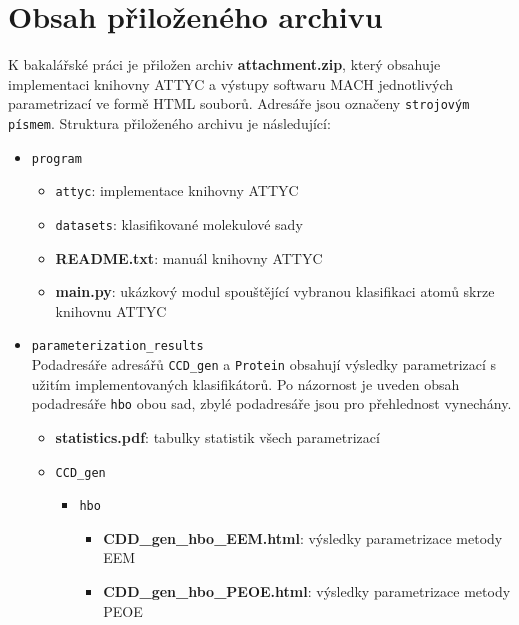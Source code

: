 
\makeatletter
{}
\makeatother
\chapter{Obsah přiloženého archivu}
\label{prilozeny_archiv}
K bakalářské práci je přiložen archiv \textbf{attachment.zip}, který obsahuje implementaci kni\-hovny ATTYC a výstupy softwaru MACH jednotlivých parametrizací ve formě HTML souborů. Adresáře  jsou označeny \verb|strojovým písmem|. Struktura přiloženého archivu je následující: 
\begin{itemize}
    \item \verb|program| 
    \begin{itemize}
        \item \verb|attyc|: implementace knihovny ATTYC
        \item \verb|datasets|: klasifikované molekulové sady 
        \item \textbf{README.txt}: manuál knihovny ATTYC
        \item\textbf{main.py}: ukázkový modul spouštějící vybranou klasifikaci atomů skrze knihovnu ATTYC
    \end{itemize}
    \item \verb|parameterization_results| \\
    Podadresáře adresářů \verb|CCD_gen| a \verb|Protein| obsahují výsledky parametrizací s uži\-tím implementovaných  klasifikátorů. Po názornost je uveden obsah podadresáře \verb|hbo| obou sad, zbylé podadresáře jsou pro přehlednost vynechány.
    \begin{itemize}
        \item \textbf{statistics.pdf}: tabulky  statistik všech parametrizací
        \item \verb|CCD_gen|
        \begin{itemize}
            \item \verb|hbo|
            \begin{itemize}
                \item \textbf{CDD\_gen\_hbo\_EEM.html}: výsledky parametrizace metody EEM
                \item \textbf{CDD\_gen\_hbo\_PEOE.html}: výsledky parametrizace metody PEOE
            \end{itemize}
        \end{itemize}

\end{itemize}
\end{itemize}
